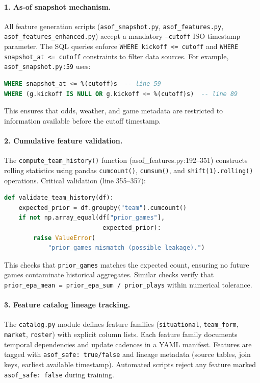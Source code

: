 \paragraph{1. As-of snapshot mechanism.}
All feature generation scripts (\texttt{asof\_snapshot.py}, \texttt{asof\_features.py}, \texttt{asof\_features\_enhanced.py}) accept a mandatory \texttt{--cutoff} ISO timestamp parameter. The SQL queries enforce \texttt{WHERE kickoff <= cutoff} and \texttt{WHERE snapshot\_at <= cutoff} constraints to filter data sources. For example, \texttt{asof\_snapshot.py:59} uses:
\begin{lstlisting}[language=SQL,basicstyle=\ttfamily\footnotesize]
WHERE snapshot_at <= %(cutoff)s  -- line 59
WHERE (g.kickoff IS NULL OR g.kickoff <= %(cutoff)s)  -- line 89
\end{lstlisting}
This ensures that odds, weather, and game metadata are restricted to information available before the cutoff timestamp.

\paragraph{2. Cumulative feature validation.}
The \texttt{compute\_team\_history()} function (asof\_features.py:192--351) constructs rolling statistics using pandas \texttt{cumcount()}, \texttt{cumsum()}, and \texttt{shift(1).rolling()} operations. Critical validation (line 355--357):
\begin{lstlisting}[language=Python,basicstyle=\ttfamily\scriptsize,breaklines=true,postbreak=\mbox{\textcolor{red}{$\hookrightarrow$}\space}]
def validate_team_history(df):
    expected_prior = df.groupby("team").cumcount()
    if not np.array_equal(df["prior_games"],
                           expected_prior):
        raise ValueError(
            "prior_games mismatch (possible leakage).")
\end{lstlisting}
This checks that \texttt{prior\_games} matches the expected count, ensuring no future games contaminate historical aggregates. Similar checks verify that \texttt{prior\_epa\_mean = prior\_epa\_sum / prior\_plays} within numerical tolerance.

\paragraph{3. Feature catalog lineage tracking.}
The \texttt{catalog.py} module defines feature families (\texttt{situational}, \texttt{team\_form}, \texttt{market}, \texttt{roster}) with explicit column lists. Each feature family documents temporal dependencies and update cadences in a YAML manifest. Features are tagged with \texttt{asof\_safe: true/false} and lineage metadata (source tables, join keys, earliest available timestamp). Automated scripts reject any feature marked \texttt{asof\_safe: false} during training.

